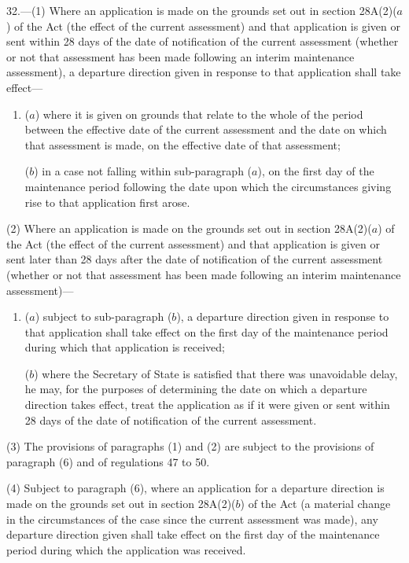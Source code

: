 \documentclass[a4paper]{article}
\begin{document}
32.—(1) Where an application is made on
the grounds set out in section 28A(2)($a$) of the Act (the effect of the current
assessment) and that application is given or sent within 28 days of the date of
notification of the current assessment (whether or not that assessment has been
made following an interim maintenance assessment), a departure direction given
in response to that application shall take effect—
\begin{enumerate}\item[]
($a$) where it is given on grounds that relate to the whole of the period between
the effective date of the current assessment and the date on which that
assessment is made, on the effective date of that assessment;

($b$) in a case not falling within sub-paragraph ($a$), on the first day of the
maintenance period following the date upon which the circumstances giving rise
to that application first arose.
\end{enumerate}

(2) Where an application is made on the grounds set out in section 28A(2)($a$) of
the Act (the effect of the current assessment) and that application is given or
sent later than 28 days after the date of notification of the current assessment
(whether or not that assessment has been made following an interim maintenance
assessment)—
\begin{enumerate}\item[]
($a$) subject to sub-paragraph ($b$), a departure direction given in response to that
application shall take effect on the first day of the maintenance period during
which that application is received;

($b$) where the Secretary of State is satisfied that there was unavoidable delay,
he may, for the purposes of determining the date on which a departure direction
takes effect, treat the application as if it were given or sent within 28 days
of the date of notification of the current assessment.
\end{enumerate}

(3) The provisions of paragraphs (1) and (2) are subject to the provisions of
paragraph (6) and of regulations 47 to 50.

(4) Subject to paragraph (6), where an application for a departure direction is
made on the grounds set out in section 28A(2)($b$) of the Act (a material change
in the circumstances of the case since the current assessment was made), any
departure direction given shall take effect on the first day of the maintenance
period during which the application was received.
\end{document}
